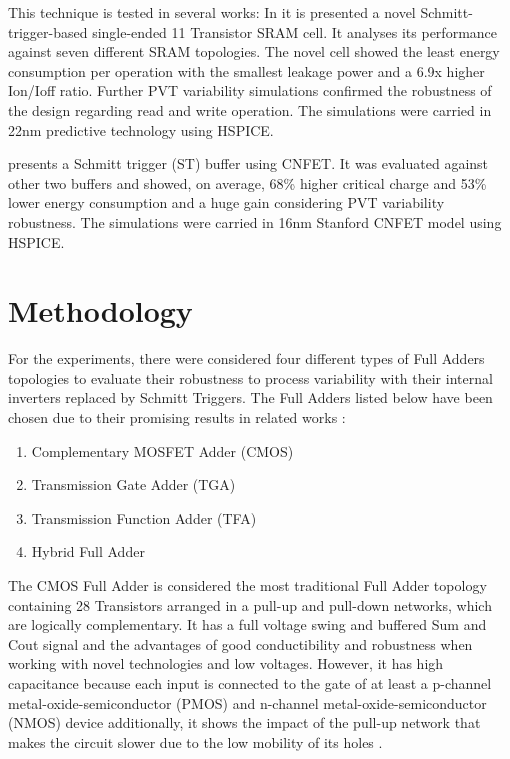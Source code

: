 \documentclass[ecp,tc, english]{iiufrgs}
\begin{document}
This technique is tested in several works: In \cite{ahmad2016single} it is presented a novel Schmitt-trigger-based single-ended 11 Transistor SRAM cell. It analyses its performance against seven different SRAM topologies. The novel cell showed the least energy consumption per operation with the smallest leakage power and a 6.9x higher Ion/Ioff ratio. Further PVT variability simulations confirmed the robustness of the design regarding read and write operation. The simulations were carried in 22nm predictive technology using HSPICE.

\cite{moghaddam2017design} presents a Schmitt trigger (ST) buffer using CNFET. It was evaluated against other two buffers and showed, on average, 68\% higher critical charge and 53\% lower energy consumption and a huge gain considering PVT variability robustness. The simulations were carried in 16nm Stanford CNFET model using HSPICE.

\chapter{Methodology}

For the experiments, there were considered four different types of Full Adders topologies to evaluate their robustness to process variability with their internal inverters replaced by Schmitt Triggers. The Full Adders listed below have been chosen due to their promising results in related works \cite{ames2016investigating} \cite{dokania2015circuit} \cite{dokania2013investigation}:

\begin{enumerate}
    \item Complementary MOSFET Adder (CMOS)
    \item Transmission Gate Adder (TGA)
    \item Transmission Function Adder (TFA)
    \item Hybrid Full Adder
\end{enumerate}

The CMOS Full Adder is considered the most traditional Full Adder topology containing 28 Transistors arranged in a pull-up and pull-down networks, which are logically complementary. It has a full voltage swing and buffered Sum and Cout signal and the advantages of good conductibility and robustness when working with novel technologies and low voltages. However, it has high capacitance because each input is connected to the gate of at least a p-channel metal-oxide-semiconductor (PMOS) and n-channel metal-oxide-semiconductor (NMOS) device additionally, it shows the impact of the pull-up network that makes the circuit slower due to the low mobility of its holes \cite{beckett2002fine} \cite{devadas2017design} \cite{islam2011design}. 
\end{document}
